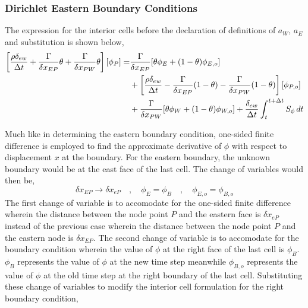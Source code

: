 \documentclass[a4paper, 12pt]{report}
\begin{document}
\begin{center}
\subsubsection{Dirichlet Eastern Boundary Conditions}
The expression for the interior cells before the declaration of definitions of $a_W$, $a_E$ and substitution is shown below,
\begin{equation*}
\begin{split}
\left[\frac{\rho\delta_{ew}}{\Delta t} + \frac{\Gamma}{\delta x_{EP}}\theta + \frac{\Gamma}{\delta x_{PW}}\theta\right][\phi_{P}] = & \frac{\Gamma }{\delta x_{EP}}[\theta\phi_{E} + (1-\theta)\phi_{E,o}]\\ & +\left[\frac{\rho\delta_{ew}}{\Delta t} - \frac{\Gamma }{\delta x_{EP}}(1-\theta) - \frac{\Gamma }{\delta x_{PW}}(1-\theta)\right][\phi_{P,o}] \\ &  + \frac{\Gamma }{\delta x_{PW}}[\theta\phi_{W} + (1-\theta)\phi_{W,o}] + \frac{\delta_{ew}}{\Delta t}\int^{t+\Delta t}_{t} S_\phi\,dt 
\end{split}
\end{equation*}

Much like in determining the eastern boundary condition, one-sided finite difference is employed to find the approximate derivative of $\phi$ with respect to displacement $x$ at the boundary. For the eastern boundary, the unknown boundary would be at the east face of the last cell. The change of variables would then be,
$$\delta x_{EP}\to \delta x_{eP} \quad,\quad \phi_{E} = \phi_{B} \quad,\quad \phi_{E,o} = \phi_{B,o}$$
The first change of variable is to accomodate for the one-sided finite difference wherein the distance between the node point $P$ and the eastern face is $\delta x_{eP}$ instead of the previous case wherein the distance between the node point $P$ and the eastern node is $\delta x_{EP}$. The second change of variable is to accomodate for the boundary condition wherein the value of $\phi$ at the right face of the last cell is $\phi_{B}$. $\phi_{B}$ represents the value of $\phi$ at the new time step meanwhile $\phi_{B,o}$ represents the value of $\phi$ at the old time step at the right boundary of the last cell. Substituting these change of variables to modify the interior cell formulation for the right boundary condition,


\end{center}
\end{document}
